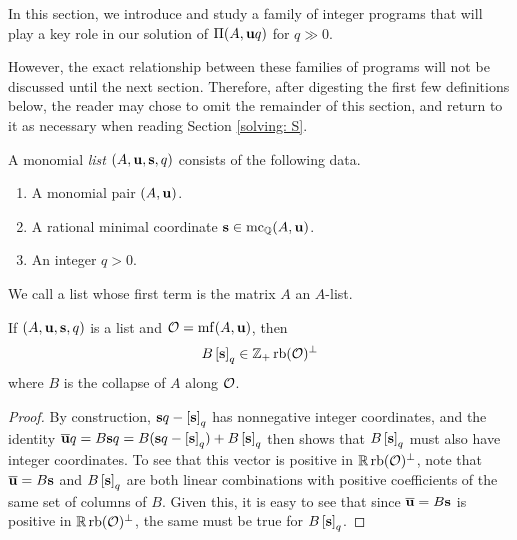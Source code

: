 \documentclass[11pt]{amsart}
\renewcommand{\!}[1]{{\color{red}\text{$\star$\,}#1\,$\star$}}
\newcommand{\ol}[1]{\overline{#1}}
\begin{document}
In this section, we introduce and study a family of integer programs that will play a key role in our solution of $\Pi(A, \mathbf{u}q)$ for $q \gg 0$.    

However, the exact relationship between these families of programs will not be discussed until the next section.  Therefore, after digesting the first few definitions below, the reader may chose to omit the remainder of this section, and return to it as necessary when reading Section \ref{solving: S}.  

\begin{definition}
A monomial \emph{list} $(A, \mathbf{u}, \mathbf{s}, q)$ consists of the following data.
\begin{enumerate}
\item A monomial pair $(A, \mathbf{u})$.
\item A rational minimal coordinate $\mathbf{s} \in \operatorname{mc}_{\mathbb{Q}}(A, \mathbf{u})$.
\item An integer $q>0$.
\end{enumerate}
\end{definition}

\begin{definition}
We call a list whose first term is the matrix $A$ an $A$-list.
\end{definition}


\begin{lemma}
\label{tail projection: L}
If $(A, \mathbf{u}, \mathbf{s}, q)$ is a list and $\mathcal{O} = \operatorname{mf}(A, \mathbf{u})$, then 
\[ B\left[ \mathbf{s} \right]_q \in \mathbb{Z}_+ \operatorname{rb}(\mathcal{O})^{\perp} \]
where $B$ is the collapse of $A$ along $\mathcal{O}$.
\end{lemma}

\begin{proof}  By construction, $\mathbf{s}q - \left[ \mathbf{s} \right]_q $ has nonnegative integer coordinates, and the identity 
$\ol{\vv{u}} q =B \vv{s} q = B ( \vv{s}q - \tail{\vv{s}}_q ) +B \tail{\vv{s}}_q$ then shows that $B \left[ \mathbf{s} \right]_q$ must also have integer coordinates.   To see that this vector is positive in $\mathbb{R} \operatorname{rb}(\mathcal{O})^{\perp}$, note that $\ol{\vv{u}} = B \vv{s}$ and $B \left[ \mathbf{s} \right]_q$ are both linear combinations with positive coefficients of the same set of columns of $B$.  Given this, it is easy to see that since $\ol{\vv{u}} = B \vv{s}$ is positive in $\mathbb{R} \operatorname{rb}(\mathcal{O})^{\perp}$, the same must be true for $B \left[ \mathbf{s} \right]_q$.
\end{proof}
\end{document}
